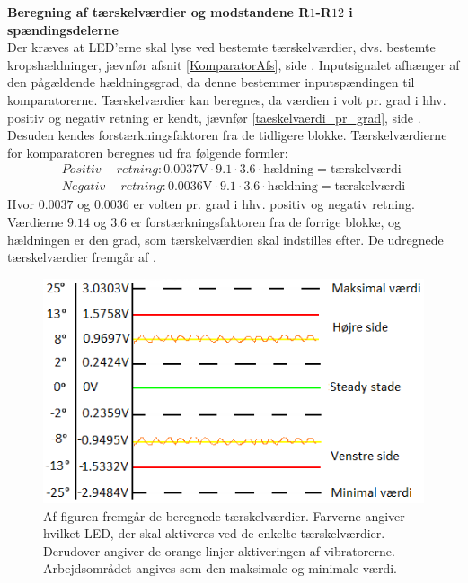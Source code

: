 
\noindent\textbf{Beregning af tærskelværdier og modstandene R$1$-R$12$ i spændingsdelerne} \\
Der kræves at LED'erne skal lyse ved bestemte tærskelværdier, dvs. bestemte kropshældninger, jævnfør afsnit \ref{KomparatorAfs}, side \pageref{KomparatorAfs}. Inputsignalet afhænger af den pågældende hældningsgrad, da denne bestemmer inputspændingen til komparatorerne. Tærskelværdier kan beregnes, da værdien i volt pr. grad i hhv. positiv og negativ retning er kendt, jævnfør \eqref{taeskelvaerdi_pr_grad}, side \pageref{Sec_Pilot_Data}. Desuden kendes forstærkningsfaktoren fra de tidligere blokke. Tærskelværdierne for komparatoren beregnes ud fra følgende formler:
\begin{eqnarray} \label{pr_grad} 
Positiv-retning : 0.0037\text{V} \cdot 9.1 \cdot 3.6 \cdot \text{hældning} = \text{tærskelværdi} \\
Negativ-retning : 0.0036\text{V} \cdot 9.1 \cdot 3.6 \cdot \text{hældning} = \text{tærskelværdi}
\end{eqnarray}
\noindent Hvor $0.0037$ og $0.0036$ er volten pr. grad i hhv. positiv og negativ retning. Værdierne $9.14$ og $3.6$ er forstærkningsfaktoren fra de forrige blokke, og hældningen er den grad, som tærskelværdien skal indstilles efter. 
De udregnede tærskelværdier fremgår af . 
\begin{figure}[H]
	\centering
	\includegraphics[scale=1.]{figures/cProblemloesning/Taerskelvaerdier.PNG}
	\caption{Af figuren fremgår de beregnede tærskelværdier. Farverne angiver hvilket LED, der skal aktiveres ved de enkelte tærskelværdier. Derudover angiver de orange linjer aktiveringen af vibratorerne. Arbejdsområdet angives som den maksimale og minimale værdi.}
	\label{fig:taerskelvaerdier}
\end{figure}

